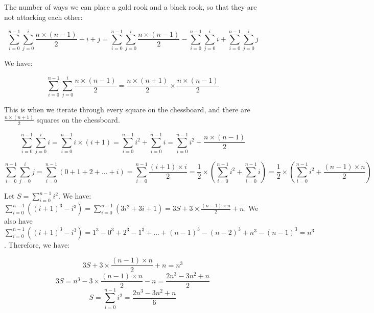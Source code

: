 \documentclass[10pt]{article}
\begin{document}
\begin{enumerate}
The number of ways we can place a gold rook and a black rook, so that they are not attacking each other:

\begin{equation*}\sum\limits_{i=0}^{n-1}\sum\limits_{j=0}^{i} \frac{n\times(n-1)}{2} - i + j = \sum\limits_{i=0}^{n-1}\sum\limits_{j=0}^{i} \frac{n\times(n-1)}{2} - \sum\limits_{i=0}^{n-1}\sum\limits_{j=0}^{i}i + \sum\limits_{i=0}^{n-1}\sum\limits_{j=0}^{i}j \tag{1}\end{equation*}

We have:

\begin{equation*}\sum\limits_{i=0}^{n-1}\sum\limits_{j=0}^{i} \frac{n\times(n-1)}{2} = \frac{n\times(n+1)}{2} \times \frac{n\times(n-1)}{2} \tag{2} \end{equation*}

This is when we iterate through every square on the chessboard, and there are $\frac{n\times(n+1)}{2}$ squares on the chessboard.

\begin{equation*}\sum\limits_{i=0}^{n-1}\sum\limits_{j=0}^{i} i = \sum\limits_{i=0}^{n-1} i \times (i + 1) =  \sum\limits_{i=0}^{n-1}i^2 + \sum\limits_{i=0}^{n-1}i = \sum\limits_{i=0}^{n-1}i^2 + \frac{n \times (n-1)}{2}\tag{3}\end{equation*}

\begin{equation*}\sum\limits_{i=0}^{n-1}\sum\limits_{j=0}^{i} j = \sum\limits_{i=0}^{n-1} (0 + 1 + 2 + ... + i)=  \sum\limits_{i=0}^{n-1} \frac{(i + 1) \times i}{2} = \frac{1}{2} \times (\sum\limits_{i=0}^{n-1} i^2 + \sum\limits_{i=0}^{n-1} i) = \frac{1}{2} \times (\sum\limits_{i=0}^{n-1} i^2 + \frac{(n-1)\times n}{2}) \tag{4} \end{equation*}

Let $S = \sum\limits_{i=0}^{n-1} i^2$. We have:
$\sum\limits_{i=0}^{n-1} ((i + 1)^ 3 - i^3) = \sum\limits_{i=0}^{n-1} (3i^2 + 3i + 1) = 3S + 3 \times \frac{(n-1) \times n}{2} + n$. We also have $\sum\limits_{i=0}^{n-1} ((i + 1)^ 3 - i^3) = 1^3 - 0^3 + 2^3 - 1^3 + ... + (n - 1)^3 - (n-2)^3 + n^3 - (n - 1)^3 = n^3$. Therefore, we have:

\begin{equation*}
    3S + 3 \times \frac{(n-1) \times n}{2} + n = n^3
\end{equation*}
\begin{equation*}
    3S = n^3 - 3 \times \frac{(n-1) \times n}{2} - n = \frac{2n^3 - 3n^2 + n}{2} 
\end{equation*}
\begin{equation*}
    S = \sum\limits_{i=0}^{n-1} i^2 =\frac{2n^3 - 3n^2 + n}{6} \tag{5}
\end{equation*}


\end{enumerate}
\end{document}
